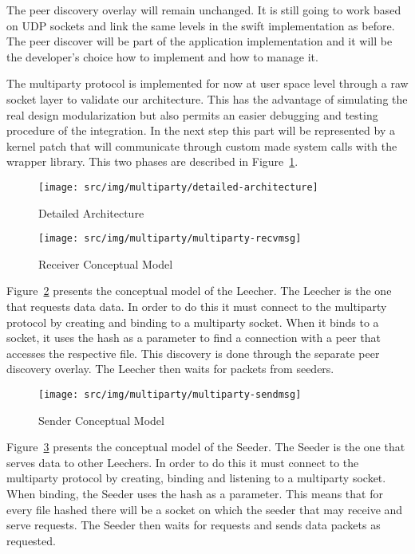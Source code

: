 The peer discovery overlay will remain unchanged. It is still going to work
based on UDP sockets and link the same levels in the swift implementation as
before. The peer discover will be part of the application implementation and
it will be the developer's choice how to implement and how to manage it.

The multiparty protocol is implemented for now at user space level through a raw
socket layer to validate our architecture. This has the advantage of
simulating the real design modularization but also permits an easier debugging
and testing procedure of the integration. In the next step this part will be
represented by a kernel patch that will communicate through custom made system
calls with the wrapper library. This two phases are described in
Figure~\ref{fig:multiparty:detailed-architecture}.

\begin{figure}
  \centering
  \texttt{[image: src/img/multiparty/detailed-architecture]}
  \caption{Detailed Architecture}
  \label{fig:multiparty:detailed-architecture}
\end{figure}

\begin{figure}
  \centering
  \texttt{[image: src/img/multiparty/multiparty-recvmsg]}
  \caption{Receiver Conceptual Model}
  \label{fig:multiparty:multiparty-recvmsg}
\end{figure}

Figure~\ref{fig:multiparty:multiparty-recvmsg} presents the conceptual model
of the Leecher. The Leecher is the one that requests data data. In order
to do this it must connect to the multiparty protocol by creating and binding
to a multiparty socket. When it binds to a socket, it uses the hash as a
parameter to find a connection with a peer that accesses the respective file.
This discovery is done through the separate peer discovery overlay. The
Leecher then waits for packets from seeders.

\begin{figure}
  \centering
  \texttt{[image: src/img/multiparty/multiparty-sendmsg]}
  \caption{Sender Conceptual Model}
  \label{fig:multiparty:multiparty-sendmsg}
\end{figure}

Figure~\ref{fig:multiparty:multiparty-sendmsg} presents the conceptual model
of the Seeder. The Seeder is the one that serves data to other Leechers. In
order to do this it must connect to the multiparty protocol by creating,
binding and listening to a multiparty socket. When binding, the Seeder
uses the hash as a parameter. This means that for every file hashed there will
be a socket on which the seeder that may receive and serve requests. The Seeder
then waits for requests and sends data packets as requested.

